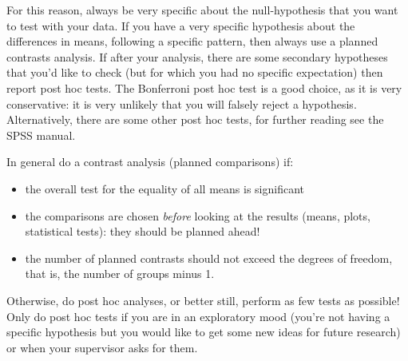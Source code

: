 For this reason, always be very specific about the null-hypothesis that you want to test with your data. If you have a very specific hypothesis about the differences in means, following a specific pattern, then always use a planned contrasts analysis. If after your analysis, there are some secondary hypotheses that you'd like to check (but for which you had no specific expectation) then report post hoc tests. The Bonferroni post hoc test is a good choice, as it is very conservative: it is very unlikely that you will falsely reject a hypothesis. Alternatively, there are some other post hoc tests, for further reading see the SPSS manual.

In general do a contrast analysis (planned comparisons) if:


\begin{itemize}
\item the overall test for the equality of all means is significant
\item the comparisons are chosen \textit{before} looking at the results (means, plots, statistical tests): they should be planned ahead!
\item the number of planned contrasts should not exceed the degrees of freedom, that is, the number of groups minus 1. 
\end{itemize}


Otherwise, do post hoc analyses, or better still, perform as few tests as possible! Only do post hoc tests if you are in an exploratory mood (you're not having a specific hypothesis but you would like to get some new ideas for future research) or when your supervisor asks for them.





